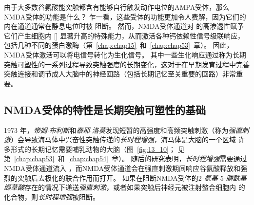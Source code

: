 由于大多数谷氨酸能突触都含有能够自行触发动作电位的AMPA受体，那么NMDA受体的功能是什么？
乍一看，这些受体的功能更加令人费解，因为它们的内在通道通常在静息电位时被  阻断。
然而，NMDA受体通道对  的高渗透性赋予它们产生细胞内 [] 显著升高的特殊能力，从而激活各种钙依赖性信号级联响应，包括几种不同的蛋白激酶（第~\ref{chap:chap15}~和~\ref{chap:chap53}~章）。
因此，NMDA受体激活可以将电信号转化为生化信号。
其中一些生化响应通过称为长期突触可塑性的一系列过程导致突触强度的长期变化，这对于在早期发育过程中完善突触连接和调节成人大脑中的神经回路（包括长期记忆至关重要的回路）非常重要。



\subsection{NMDA受体的特性是长期突触可塑性的基础}

1973 年，\textit{帝姆$\cdot$布利斯}和\textit{泰耶$\cdot$洛莫}发现短暂的高强度和高频突触刺激（称为\textit{强直刺激}）会导致海马体中兴奋性突触传递的\textit{长时程增强}，海马体是大脑的一个区域 许多形式的长期记忆需要哺乳动物的大脑（图~\ref{fig:13_10}；
见第~\ref{chap:chap53}~和~\ref{chap:chap54}~章）。
随后的研究表明，\textit{长时程增强}需要通过NMDA受体通道流入 ，而NMDA受体通道会在强直刺激期间响应谷氨酸释放和强烈的突触后去极化的联合作用而打开。
如果在阻断NMDA受体的2\textit{-氨基-}5\textit{-膦酰基缬草酸}存在的情况下递送\textit{强直刺激}，或者如果突触后神经元被注射螯合细胞内  的化合物，则\textit{长时程增强}被阻断。


